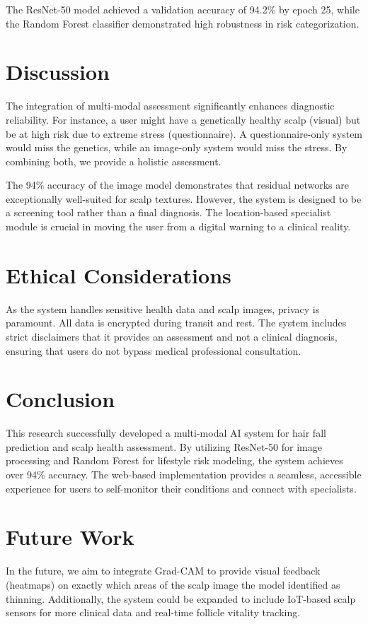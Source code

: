\documentclass[conference]{IEEEtran}
\begin{document}
The ResNet-50 model achieved a validation accuracy of 94.2\% by epoch 25, while the Random Forest classifier demonstrated high robustness in risk categorization.

\section{Discussion}
The integration of multi-modal assessment significantly enhances diagnostic reliability. For instance, a user might have a genetically healthy scalp (visual) but be at high risk due to extreme stress (questionnaire). A questionnaire-only system would miss the genetics, while an image-only system would miss the stress. By combining both, we provide a holistic assessment.

The 94\% accuracy of the image model demonstrates that residual networks are exceptionally well-suited for scalp textures. However, the system is designed to be a screening tool rather than a final diagnosis. The location-based specialist module is crucial in moving the user from a digital warning to a clinical reality.

\section{Ethical Considerations}
As the system handles sensitive health data and scalp images, privacy is paramount. All data is encrypted during transit and rest. The system includes strict disclaimers that it provides an assessment and not a clinical diagnosis, ensuring that users do not bypass medical professional consultation.

\section{Conclusion}
This research successfully developed a multi-modal AI system for hair fall prediction and scalp health assessment. By utilizing ResNet-50 for image processing and Random Forest for lifestyle risk modeling, the system achieves over 94\% accuracy. The web-based implementation provides a seamless, accessible experience for users to self-monitor their conditions and connect with specialists.

\section{Future Work}
In the future, we aim to integrate Grad-CAM to provide visual feedback (heatmaps) on exactly which areas of the scalp image the model identified as thinning. Additionally, the system could be expanded to include IoT-based scalp sensors for more clinical data and real-time follicle vitality tracking.
\end{document}
